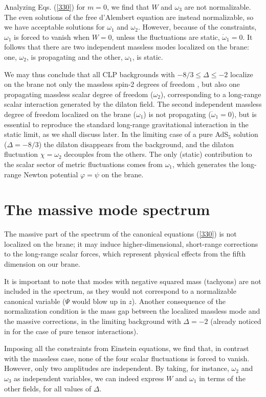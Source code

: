 \documentclass[a4paper,12pt]{article}
\begin{document}
Analyzing Eqs. (\ref{330}) for $m=0$, we find that $W$ and $\omega_3$
are not normalizable. The even solutions of the free d'Alembert equation
are instead normalizable, so we have acceptable solutions  for
$\omega_1$ and $\omega_2$. However, because of the constraints,
$\omega_1$ is forced to vanish when $W=0$, unless the fluctuations
are static, $\dot \omega_1=0$. It follows that there are two
independent massless modes localized on the brane: one,
$\omega_2$, is propagating and the other, $\omega_1$,  is static.

We may thus conclude that all CLP backgrounds with $-8/3 \leq
\Delta \leq -2$ localize on the brane not only the massless spin-2
degrees of freedom \cite{CLP}, but also one propagating massless
scalar degree of freedom ($\omega_2$), corresponding to a long-range
scalar interaction generated by the dilaton field. The second
independent massless degree of freedom localized on the brane
($\omega_1$) is not propagating ($\dot \omega_1=0$), but is essential
to reproduce the standard long-range gravitational interaction in the
static limit, as we shall discuss later. In the limiting case of a pure
AdS$_5$ solution  ($\Delta=-8/3$) the dilaton disappears from the
background, and the dilaton fluctuation $\chi=\omega_2$ decouples
from the others. The only (static) contribution to the scalar
sector of metric fluctuations comes from $\omega_1$, which
generates the long-range Newton potential $\varphi=\psi$ on the
brane.


\section{The massive mode spectrum}

The massive part of the spectrum of the canonical equations
(\ref{330}) is not localized on the brane; it may induce
higher-dimensional, short-range corrections to the long-range
scalar forces, which represent physical effects from
the fifth dimension on our brane.

It is important to note that modes with negative squared mass
(tachyons) are not included in the spectrum, as they would not
correspond to a normalizable canonical variable ($\Psi$ would blow
up in $z$). Another consequence of the normalization condition is
the mass gap between the localized massless mode and the massive
corrections, in the limiting background with $\Delta=-2$ (already
noticed in \cite{CLP} for the case of pure tensor interactions).

Imposing all the constraints from Einstein equations, we find
that, in contrast with the massless case, none of the four scalar
fluctuations is forced to vanish. However, only two amplitudes are
independent. By taking, for instance, $\omega_2$ and $\omega_3$ as
independent variables, we can indeed express $W$ and $\omega_1$ in
terms of the other fields, for all values of $\Delta$.
\end{document}

